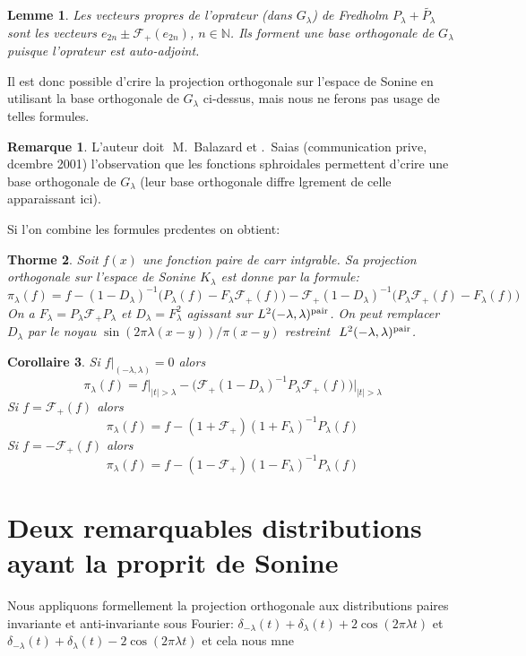 \documentclass[11pt]{amsart}
\newtheorem{theoreme}{Thorme}[]
\newtheorem{corollaire}[theoreme]{Corollaire}
\newtheorem{lemme}[theoreme]{Lemme}
\theoremstyle{definition}
\newtheorem{remarque}{Remarque}
\newcommand\NN{{\mathbb N}}
\newcommand\cF{{\mathcal F}}
\let\wt=\widetilde
\let\la=\lambda
\begin{document}
\begin{lemme} 
Les vecteurs propres de l'oprateur (dans $G_\la$) 
de Fredholm $P_\la
+ \wt{P_\la}$ sont les vecteurs $e_{2n} \pm \cF_+(e_{2n})$, $n\in\NN$. 
Ils forment une base orthogonale de $G_\la$ puisque l'oprateur est
auto-adjoint.
\end{lemme}

Il est donc possible d'crire la projection orthogonale sur l'espace
de Sonine en utilisant la base orthogonale de $G_\la$ ci-dessus, mais
nous ne ferons pas usage de telles formules.


\begin{remarque} 
L'auteur doit  M.~Balazard et .~Saias (communication prive,
dcembre 2001) l'observation que les fonctions sphroidales per\-mettent
d'crire une base orthogonale de $G_\la$ (leur base orthogonale
diffre lgrement de celle apparaissant ici).
\end{remarque}

Si l'on combine les formules prcdentes on obtient:

\begin{theoreme}
Soit $f(x)$ une fonction paire de carr intgrable. Sa projection
orthogonale sur l'espace de Sonine $K_\la$ est donne par la formule:
$$\pi_\la(f) = f - (1 - D_\la)^{-1}\Big(P_\la(f) - F_\la\cF_+(f)\Big)
- \cF_+(1 - D_\la)^{-1}\Big(P_\la\cF_+(f) -  F_\la(f)\Big)$$
On a $F_\la = P_\la \cF_+ P_\la$ et $D_\la = F_\la^2$ 
agissant sur $L^2(-\la,\la)^{\rm pair}$. On peut remplacer $D_\la$ par le noyau 
$\sin(2\pi\la(x-y))/\pi(x-y)$ restreint  $L^2(-\la,\la)^{\rm pair}$.
\end{theoreme}

\begin{corollaire}
Si $f|_{(-\la,\la)} = 0$ alors 
$$\pi_\la(f) = f\Big|_{|t|>\la} - \Big(\cF_+(1 -
D_\la)^{-1}P_\la\cF_+(f)\Big)\Big|_{|t|>\la}$$
Si $f = \cF_+(f)$ alors
$$\pi_\la(f) = f - (1 + \cF_+)(1+F_\la)^{-1}P_\la(f)$$
Si $f = -\cF_+(f)$ alors
$$\pi_\la(f) = f - (1 - \cF_+)(1-F_\la)^{-1}P_\la(f)$$
\end{corollaire}

\section{Deux remarquables distributions ayant la proprit de Sonine}

Nous appliquons formellement la projection orthogonale aux
distributions paires invariante et anti-invariante sous Fourier:
$\delta_{-\la}(t) + \delta_\la(t) + 2\cos(2\pi\la t)$ et
$\delta_{-\la}(t) + \delta_\la(t) - 2\cos(2\pi\la t)$ et cela nous
mne  
\end{document}
